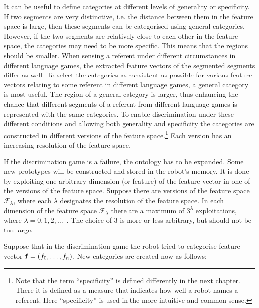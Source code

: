 It can be useful to define categories at different levels of generality or specificity. If two segments are very distinctive, i.e. the distance between them in the feature space is large, then these segments can be categorised using general categories. However, if the two segments are relatively close to each other in the feature space, the categories may need to be more specific. This means that the regions should be smaller. When sensing a referent under different circumstances in different language games, the extracted feature vectors of the segmented segments differ as well. To select the categories as consistent as possible for various feature vectors relating to some referent in different language games, a general category is most useful. The region of a general category is larger, thus enhancing the chance that different segments of a referent from different language games is represented with the same categories. To enable discrimination under these different conditions and allowing both generality and specificity the categories are constructed in different versions of the feature space.\footnote{Note that the term ``specificity'' is defined differently in the next chapter. There it is defined as a measure that indicates how well a robot names a referent. Here ``specificity'' is used in the more intuitive and common sense.} Each version has an increasing resolution of the feature space.

If the discrimination game is a failure, the ontology has to be expanded. Some new prototypes will be constructed and stored in the robot's memory. It is done by exploiting one arbitrary dimension (or feature) of the feature vector in one of the versions of the feature space. Suppose there are versions of the feature space ${\mathcal F}_\lambda$, where each $\lambda$ designates the resolution of the feature space. In each dimension of the feature space ${\mathcal F}_\lambda$ there are a maximum of $3^\lambda$ exploitations, where $\lambda=0,1,2,\ldots$~. The choice of 3 is more or less arbitrary, but should not be too large. 

Suppose that in the discrimination game the robot tried to categorise feature vector ${\bf f}=(f_0,\ldots,f_n)$. New categories are created now as follows:

